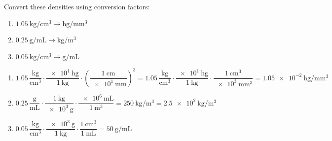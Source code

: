\begin{exercise}
    Convert these densities using conversion factors:
    \begin{enumerate}[label=\letraminuscula]
        \item \(\qty{1.05}{\kg\per\cubic\cm} \to \unit{\hecto\gram\per\cubic\mm}\)
        \item \(\qty{0.25}{\g\per\mL} \to \unit{\kg\per\cubic\m}\)
        \item \(\qty{0.05}{\kg\per\cubic\cm} \to \unit{\g\per\mL}\)
    \end{enumerate}
    \begin{solu}
        \begin{enumerate}[label=\alph*)]
            \item \(\num{1.05}\,\dfrac{\unit{\kg}}{\unit{\cubic\cm}} \cdot \dfrac{\qty{e1}{\hecto\gram}}{\qty{1}{\kg}} \cdot \left(\dfrac{\qty{1}{\cm}}{\qty{e1}{\mm}}\right)^{3} = \num{1.05}\,\dfrac{\unit{\kg}}{\unit{\cubic\cm}} \cdot \dfrac{\qty{e1}{\hecto\gram}}{\qty{1}{\kg}} \cdot \dfrac{\qty{1}{\cubic\cm}}{\qty{e3}{\cubic\mm}} = \qty{1.05e-2}{\hecto\gram\per\cubic\mm}\)
            \item \(\num{0.25}\,\dfrac{\unit{\g}}{\unit{\mL}} \cdot \dfrac{\qty{1}{\kg}}{\qty{e3}{\g}} \cdot \dfrac{\qty{e6}{\mL}}{\qty{1}{\cubic\m}} = \qty{250}{\kg\per\cubic\m} = \qty{2.5e2}{\kg\per\cubic\m}\)
            \item \(\num{0.05}\,\dfrac{\unit{\kg}}{\unit{\cubic\cm}} \cdot \dfrac{\qty{e3}{\g}}{\qty{1}{\kg}} \cdot \dfrac{\qty{1}{\cubic\cm}}{\qty{1}{\mL}} = \qty{50}{\g\per\mL}\)
        \end{enumerate}
    \end{solu}
\end{exercise}

